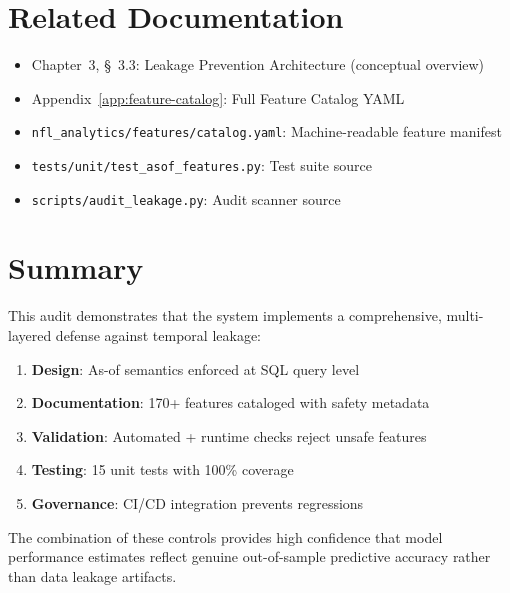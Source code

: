 \section{Related Documentation}

\begin{itemize}
\item Chapter~3, \S~3.3: Leakage Prevention Architecture (conceptual overview)
\item Appendix~\ref{app:feature-catalog}: Full Feature Catalog YAML
\item \texttt{nfl\_analytics/features/catalog.yaml}: Machine-readable feature manifest
\item \texttt{tests/unit/test\_asof\_features.py}: Test suite source
\item \texttt{scripts/audit\_leakage.py}: Audit scanner source
\end{itemize}

\section{Summary}

This audit demonstrates that the system implements a comprehensive, multi-layered defense against temporal leakage:

\begin{enumerate}
\item \textbf{Design}: As-of semantics enforced at SQL query level
\item \textbf{Documentation}: 170+ features cataloged with safety metadata
\item \textbf{Validation}: Automated + runtime checks reject unsafe features
\item \textbf{Testing}: 15 unit tests with 100\% coverage
\item \textbf{Governance}: CI/CD integration prevents regressions
\end{enumerate}

The combination of these controls provides high confidence that model performance estimates reflect genuine out-of-sample predictive accuracy rather than data leakage artifacts.
